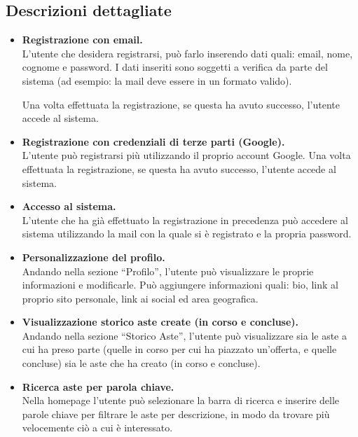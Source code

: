 \subsection{Descrizioni dettagliate}
\begin{itemize}
	\item \textbf{Registrazione con email.}\\
	      L'utente che desidera registrarsi, può farlo inserendo dati quali: email, nome, cognome e password. I dati inseriti sono soggetti a verifica da parte del sistema (ad esempio: la mail deve essere in un formato valido).

	      Una volta effettuata la registrazione, se questa ha avuto successo, l'utente accede al sistema.

	\item \textbf{Registrazione con credenziali di terze parti (Google).}\\
	      L'utente può registrarsi più utilizzando il proprio account Google. Una volta effettuata la registrazione, se questa ha avuto successo, l'utente accede al sistema.

	\item \textbf{Accesso al sistema.}\\
	      L'utente che ha già effettuato la registrazione in precedenza può accedere al sistema utilizzando la mail con la quale si è registrato e la propria password.

	\item \textbf{Personalizzazione del profilo.}\\
	      Andando nella sezione “Profilo”, l'utente può visualizzare le proprie informazioni e modificarle. Può aggiungere informazioni quali: bio, link al proprio sito personale, link ai social ed area geografica.

	\item \textbf{Visualizzazione storico aste create (in corso e concluse).}\\
	      Andando nella sezione “Storico Aste”, l'utente può visualizzare sia le aste a cui ha preso parte (quelle in corso per cui ha piazzato un'offerta, e quelle concluse) sia le aste che ha creato (in corso e concluse).

	\item \textbf{Ricerca aste per parola chiave.}\\
	      Nella homepage l'utente può selezionare la barra di ricerca e inserire delle parole chiave per filtrare le aste per descrizione, in modo da trovare più velocemente ciò a cui è interessato.


\end{itemize}

